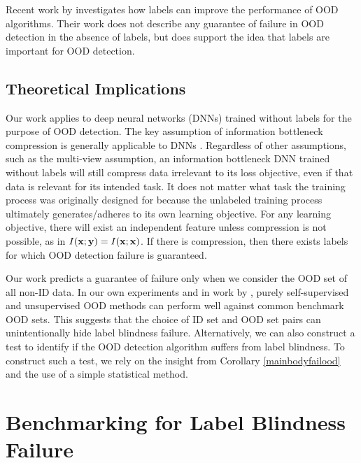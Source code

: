 \documentclass{article} %
\theoremstyle{plain}
\theoremstyle{definition}
\theoremstyle{remark}
\begin{document}
Recent work by \citep{du2024and} investigates how labels can improve the performance of OOD algorithms. Their work does not describe any guarantee of failure in OOD detection  in the absence of labels, but does support the idea that labels are important for OOD detection.






\vspace{-2mm}\subsection{Theoretical Implications}\vspace{-2mm}

Our work applies to deep neural networks (DNNs) trained without labels for the purpose of OOD detection. The key assumption of information bottleneck compression is generally applicable to DNNs \citep{shwartz2017opening}. Regardless of other assumptions, such as the multi-view assumption, an information bottleneck DNN trained without labels will still compress data irrelevant to its loss objective, even if that data is relevant for its intended task. It does not matter what task the training process was originally designed for because the unlabeled training process ultimately generates/adheres to its own learning objective. For any learning objective, there will exist an independent feature unless compression is not possible, as in $I({\mathbf{x}};{\mathbf{y}}) = I({\mathbf{x}};{\mathbf{x}})$. If there is compression, then there exists labels for which OOD detection failure is guaranteed. 

Our work predicts a guarantee of failure only when we consider the OOD set of all non-ID data. In our own experiments and in work by \citep{sehwag2021ssd, hendrycks2019using, liu2023unsupervised}, purely self-supervised and unsupervised OOD methods can perform well against common benchmark OOD sets. This suggests that the choice of ID set and OOD set pairs can unintentionally hide label blindness failure. Alternatively, we can also construct a test to identify if the OOD detection algorithm suffers from label blindness. To construct such a test, we rely on the insight from Corollary \ref{mainbodyfailood} and the use of a simple statistical method.  


\vspace{-2mm}\section{Benchmarking for Label Blindness Failure}\vspace{-2mm}
\end{document}
